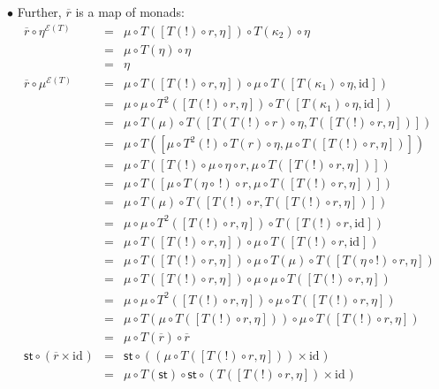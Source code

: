 \documentclass{LMCS}
\newcommand{\after}{\mathrel{\circ}}
\newcommand{\idmap}[1][]{\ensuremath{\mathrm{id}_{#1}}}
\newcommand{\st}{\ensuremath{\mathsf{st}}}
\newcommand{\E}{\ensuremath{\mathcal{E}}}
\begin{document}
{\begin{iteMize}{$\bullet$}
\noindent Further, $\overline{r}$ is a map of monads:
$$\begin{array}{rcl}
\overline{r} \after \eta^{\E(T)}
& = &
\mu \after T([T(!)\after r,\eta]) \after T(\kappa_{2}) \after \eta \\
& = &
\mu \after T(\eta) \after \eta \\
& = &
\eta \\
\overline{r} \after \mu^{\E(T)}
& = &
\mu \after T([T(!)\after r,\eta]) \after \mu \after
   T([T(\kappa_{1}) \after \eta, \idmap]) \\
& = &
\mu \after \mu \after T^{2}([T(!)\after r,\eta]) \after 
   T([T(\kappa_{1}) \after \eta, \idmap]) \\
& = &
\mu \after T(\mu) \after 
   T([T(T(!)\after r) \after \eta, T([T(!)\after r,\eta])]) \\
& = &
\mu \after T([\mu \after T^{2}(!)\after T(r) \after \eta, 
   \mu \after T([T(!)\after r,\eta])]) \\
& = &
\mu \after T([T(!)\after \mu \after \eta \after r, 
   \mu \after T([T(!)\after r,\eta])]) \\
& = &
\mu \after T([\mu \after T(\eta \after\, !)\after r, 
   \mu \after T([T(!)\after r,\eta])]) \\
& = &
\mu \after T(\mu) \after 
   T([T(!)\after r, T([T(!)\after r,\eta])]) \\
& = &
\mu \after \mu \after T^{2}([T(!)\after r,\eta]) \after 
   T([T(!)\after r, \idmap]) \\
& = &
\mu \after T([T(!)\after r,\eta]) \after \mu \after 
   T([T(!)\after r, \idmap]) \\
& = &
\mu \after T([T(!)\after r,\eta]) \after \mu \after 
   T(\mu) \after T([T(\eta \after !)\after r,\eta]) \\
& = &
\mu \after T([T(!)\after r,\eta]) \after \mu \after 
   \mu \after T([T(!)\after r,\eta]) \\
& = &
\mu \after \mu \after T^{2}([T(!)\after r,\eta]) \after 
   \mu \after T([T(!)\after r,\eta]) \\
& = &
\mu \after T(\mu \after T([T(!)\after r,\eta])) \after 
   \mu \after T([T(!)\after r,\eta]) \\
& = &
\mu \after T(\overline{r}) \after \overline{r} \\
\st \after (\overline{r}\times\idmap)
& = &
\st \after ((\mu \after T([T(!)\after r,\eta]))\times\idmap) \\
& = &
\mu \after T(\st) \after \st \after (T([T(!)\after r,\eta])\times\idmap) \\

\end{array}$$
\end{iteMize}}
\end{document}
